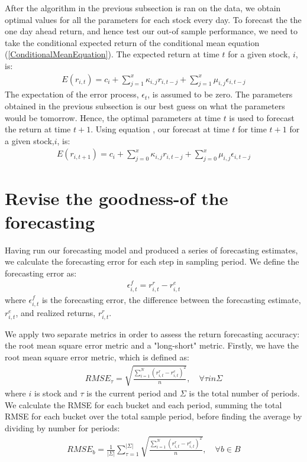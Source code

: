After the algorithm in the previous subsection is ran on the data, we obtain optimal values for all the parameters for each stock every day. To forecast the the one day ahead return, and hence test our out-of sample performance, we need to take the conditional expected return of the conditional mean equation (\ref{ConditionalMeanEquation}). The expected return at time $t$ for a given stock, $i$, is:
\begin{align} 
    E(r_{i,t})=c_i+\sum_{j=1}^x\kappa_{i,j} r_{i,t-j}+\sum_{j=1}^x\mu_{i,j} \epsilon_{i,t-j} \label{ExpectedConditionalMean}
\end{align}
The expectation of the error process, $\epsilon_t$, is assumed to be zero. The parameters obtained in the previous subsection is our best guess on what the parameters would be tomorrow. Hence, the optimal parameters at time $t$ is used to forecast the return at time $t+1$. Using equation \label{ExpectedConditionalMean}, our forecast at time $t$ for time $t+1$ for a given stock,$i$, is:
\begin{align} 
    E(r_{i,t+1})=c_i+\sum_{j=0}^x\kappa_{i,j} r_{i,t-j}+\sum_{j=0}^x\mu_{i,j} \epsilon_{i,t-j}
\end{align}

\section*{Revise the goodness-of the forecasting}
Having run our forecasting model and produced a series of forecasting estimates, we calculate the forecasting error for each step in sampling period. We define the forecasting error as:
\begin{align}
    \epsilon_{i,t}^{f} = r_{i,t}^{r} - r_{i,t}^{e}
\end{align}
where $\epsilon_{i,t}^{f}$ is the forecasting error, the difference between the forecasting estimate, $r_{i,t}^{e}$, and realized returns, $r_{i,t}^{r}$.

We apply two separate metrics in order to assess the return forecasting accuracy: the root mean square error metric and a "long-short" metric. Firstly, we have the root mean square error metric, which is defined as:
\begin{align}
    RMSE_{\tau} = \sqrt{\frac{\sum_{i=1}^{N}(r_{i,t}^{r} - r_{i,t}^{e})^{2}}{n}}, \quad \forall \tau in \Sigma
\end{align}
where $i$ is stock and $\tau$ is the current period and $\Sigma$ is the total number of periods. We calculate the RMSE for each bucket and each period, summing the total RMSE for each bucket over the total sample period, before finding the average by dividing by number for periods:
\begin{align}
    RMSE_{b} = \frac{1}{|\Sigma|}\sum_{\tau=1}^{|\Sigma|}\sqrt{\frac{\sum_{i=1}^{N}(r_{i,t}^{r} - r_{i,t}^{e})^{2}}{n}}, \quad \forall b \in B
\end{align}

